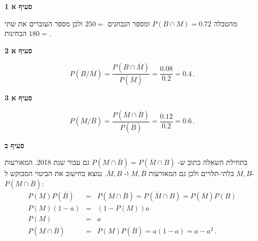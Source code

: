 \textbf{סעיף א 1}

מהטבלה
$P(B\cap M)=0.72$
ומספר הנבחנים
$250=$
ולכן מספר העוברים את שתי הבחינות
$180=$.

\textbf{סעיף א 2}

\[
P(B/\overline{M})=\frac{P(B\cap\overline{M})}{P(\overline{M})}=
\frac{0.08}{0.2}=0.4\,.
\]

\textbf{סעיף א 3}

\[
P(\overline{M}/\overline{B})=\frac{P(\overline{M}\cap \overline{B})}{P(\overline{B})}=\frac{0.12}{0.2}=0.6\,.
\]

\textbf{סעיף ב}

בתחילת השאלה כתוב ש-%
$P(M\cap\overline{B})=P(\overline{M}\cap B)$
גם עבור שנת 2018. המאורעות
$M,B$
בלתי-תלויים ולכן גם המאורעות
$M,\overline{B}$
ו-%
$\overline{M},B$.
נמצא בחישוב את הביטוי המבוקש ל-%
$P(M\cap\overline{B})$:
\begin{eqnarray*}
P(M) P(\overline{B})&=&P(M\cap\overline{B})=
P(\overline{M}\cap B)=P(\overline{M})P(B)\\
P(M)(1-a)&=&(1-P(M))a\\
P(M)&=&a\\
P(M\cap\overline{B})&=&P(M)P(\overline{B})=a(1-a)=a-a^2\,.
\end{eqnarray*}
